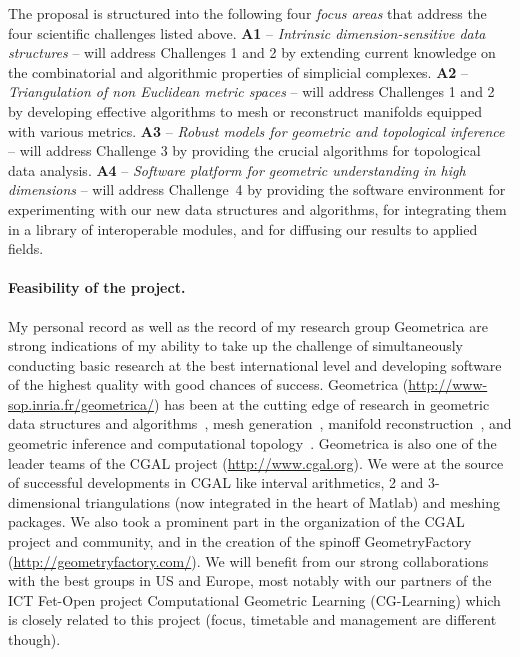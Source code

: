 The proposal is structured into the following four {\em focus areas}  that address the four scientific challenges listed above.
{\bf A1} -- {\em Intrinsic dimension-sensitive data  structures} --  will address Challenges 1 and 2 by extending current knowledge on the combinatorial and algorithmic properties of simplicial complexes. 
  {\bf A2} --  {\em Triangulation of non Euclidean metric spaces} -- will address Challenges 1 and 2 by developing effective algorithms to mesh or reconstruct manifolds equipped with various metrics.   {\bf A3} -- {\em Robust models for geometric and topological inference} -- will address Challenge 3 by providing the crucial  algorithms for topological data analysis.
 {\bf A4} --  {\em  Software platform for geometric understanding in high dimensions} -- will address Challenge~4 by providing the software environment for experimenting with our new data structures and algorithms, for integrating them in a library of interoperable modules, and for diffusing our results to applied fields. 
\vspace{-3mm}

\paragraph{Feasibility of the project.} 


My personal record as well as the record of my research group Geometrica are strong indications of my ability to take up the challenge of simultaneously conducting basic research at the best international level and developing software of the highest quality with good chances of success.  
Geometrica (\url{http://www-sop.inria.fr/geometrica/}) has been at the cutting edge of research in geometric data
structures and algorithms~\cite{by-ag-98}, mesh
generation~\cite{geometrica-ecg-book}, manifold
reconstruction~\cite{geometrica-7142i,geometrica-bgo-09}, and geometric inference and computational topology~\cite{ccsm-gipm-2011,geometrica-cseh-07}. Geometrica is also one of the leader teams of the CGAL project (\url{http://www.cgal.org}{}).  We were at the source of successful developments in CGAL like interval arithmetics, 2 and 3-dimensional triangulations (now integrated in the heart of Matlab) and meshing packages. We also took a prominent part in the organization of the CGAL project and community, and in the creation of the spinoff GeometryFactory (\url{http://geometryfactory.com/}).
%
We will benefit from our strong collaborations with the best groups in US and  Europe,
most notably with our partners of the ICT Fet-Open project Computational Geometric Learning (CG-Learning) which is closely related to this project (focus, timetable and management are different though).

